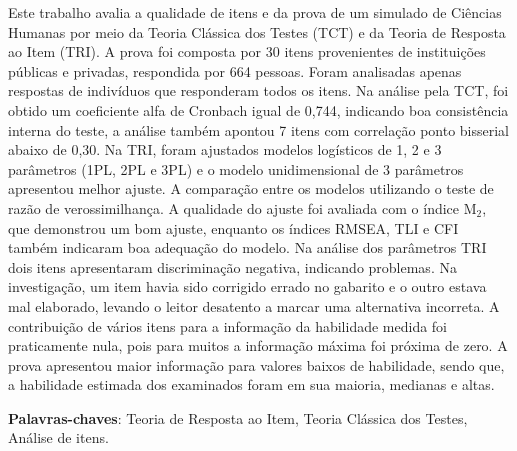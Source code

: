 \begin{resumo}
	
Este trabalho avalia a qualidade de itens e da prova de um simulado de Ciências Humanas por meio da Teoria Clássica dos Testes (TCT) e da Teoria de Resposta ao Item (TRI). A prova foi composta por 30 itens provenientes de instituições públicas e privadas, respondida por 664 pessoas. Foram analisadas apenas respostas de indivíduos que responderam todos os itens. Na análise pela TCT, foi obtido um coeficiente alfa de Cronbach igual de 0,744, indicando boa consistência interna do teste, a análise também apontou 7 itens com correlação ponto bisserial abaixo de 0,30.  Na TRI, foram ajustados modelos logísticos de 1, 2 e 3 parâmetros (1PL, 2PL e 3PL) e o modelo unidimensional de 3 parâmetros apresentou melhor ajuste. A comparação entre os modelos utilizando o teste de razão de verossimilhança. A qualidade do ajuste foi avaliada com o índice M$_2$, que demonstrou um bom ajuste,  enquanto os índices RMSEA, TLI e CFI também indicaram boa adequação do modelo. Na análise dos parâmetros TRI dois itens apresentaram discriminação negativa, indicando problemas. Na investigação, um item havia sido corrigido errado no gabarito e o outro estava mal elaborado, levando o leitor desatento a marcar uma alternativa incorreta. A contribuição de vários itens para a informação da habilidade medida foi praticamente nula, pois para muitos a informação máxima foi próxima de zero. A prova apresentou maior informação para valores baixos de habilidade, sendo que, a habilidade estimada dos examinados foram em sua maioria, medianas e altas.

\textbf{Palavras-chaves}: Teoria de Resposta ao Item, Teoria Clássica dos Testes, Análise de itens.
\end{resumo}

